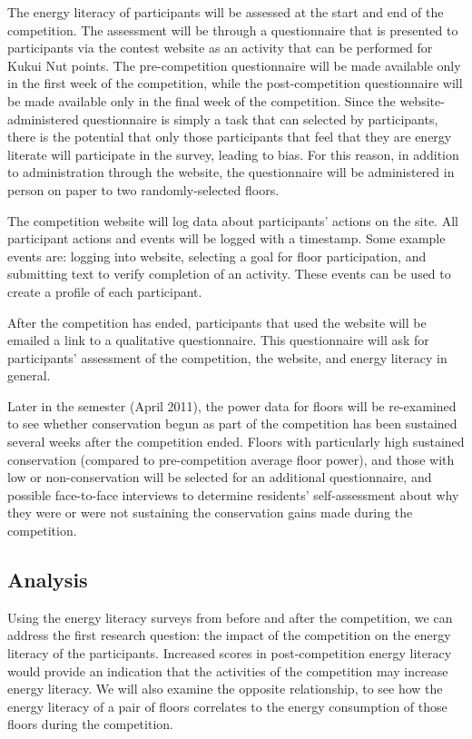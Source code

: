 The energy literacy of participants will be assessed at the start and end of the competition. The assessment will be through a questionnaire that is presented to participants via the contest website as an activity that can be performed for Kukui Nut points. The pre-competition questionnaire will be made available only in the first week of the competition, while the post-competition questionnaire will be made available only in the final week of the competition. Since the website-administered questionnaire is simply a task that can selected by participants, there is the potential that only those participants that feel that they are energy literate will participate in the survey, leading to bias. For this reason, in addition to administration through the website, the questionnaire will be administered in person on paper to two randomly-selected floors.

The competition website will log data about participants' actions on the site. All participant actions and events will be logged with a timestamp. Some example events are: logging into website, selecting a goal for floor participation, and submitting text to verify completion of an activity. These events can be used to create a profile of each participant.

After the competition has ended, participants that used the website will be emailed a link to a qualitative questionnaire. This questionnaire will ask for participants' assessment of the competition, the website, and energy literacy in general.

Later in the semester (April 2011), the power data for floors will be re-examined to see whether conservation begun as part of the competition has been sustained several weeks after the competition ended. Floors with particularly high sustained conservation (compared to pre-competition average floor power), and those with low or non-conservation will be selected for an additional questionnaire, and possible face-to-face interviews to determine residents' self-assessment about why they were or were not sustaining the conservation gains made during the competition.

\subsection{Analysis}

Using the energy literacy surveys from before and after the competition, we can 
address the first research question: the impact of the competition on the energy literacy of the participants. Increased scores in post-competition energy literacy would provide an indication that the activities of the competition may increase energy literacy. We will also examine the opposite relationship, to see how the energy literacy of a pair of floors correlates to the energy consumption of those floors during the competition.

